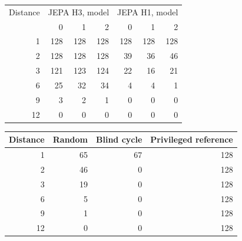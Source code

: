 \begin{tabular}{rrrrrrr}
\toprule
\rowcolor{Navy!8}
Distance & \multicolumn{3}{c}{JEPA H3, model} & \multicolumn{3}{c}{JEPA H1, model} \\
 & 0 & 1 & 2 & 0 & 1 & 2 \\
\midrule
1 & 128 & 128 & 128 & 128 & 128 & 128 \\
2 & 128 & 128 & 128 & 39 & 36 & 46 \\
3 & 121 & 123 & 124 & 22 & 16 & 21 \\
6 & 25 & 32 & 34 & 4 & 4 & 1 \\
9 & 3 & 2 & 1 & 0 & 0 & 0 \\
12 & 0 & 0 & 0 & 0 & 0 & 0 \\
\bottomrule
\end{tabular}

\medskip
\begin{tabular}{rrrr}
\toprule
\rowcolor{Navy!8}
Distance & Random & Blind cycle & Privileged reference \\
\midrule
1 & 65 & 67 & 128 \\
2 & 46 & 0 & 128 \\
3 & 19 & 0 & 128 \\
6 & 5 & 0 & 128 \\
9 & 1 & 0 & 128 \\
12 & 0 & 0 & 128 \\
\bottomrule
\end{tabular}
